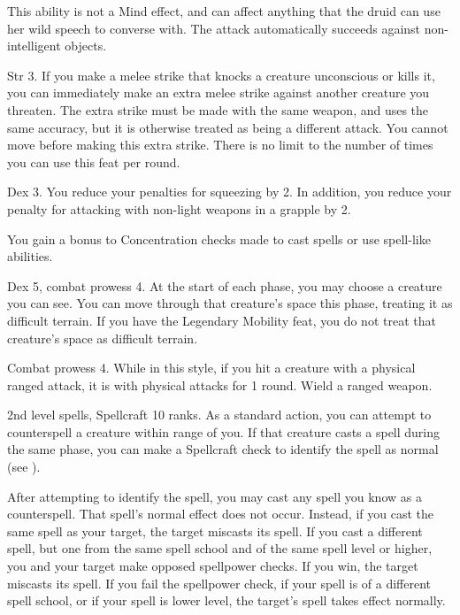 This ability is not a Mind effect, and can affect anything that the druid can use her wild speech to converse with.
The attack automatically succeeds against non-intelligent objects.

\featpre Str 3.
\featben If you make a melee strike that knocks a creature unconscious or kills it, you can immediately make an extra melee strike against another creature you threaten.
The extra strike must be made with the same weapon, and uses the same accuracy, but it is otherwise treated as being a different attack.
You cannot move before making this extra strike.
There is no limit to the number of times you can use this feat per round.

\featpre Dex 3.
\featben You reduce your penalties for squeezing by 2. In addition, you reduce your penalty for attacking with non-light weapons in a grapple by 2.

\featben You gain a  bonus to Concentration checks made to cast spells or use spell-like abilities.

\featpre Dex 5, combat prowess 4.
\featben At the start of each phase, you may choose a creature you can see.
You can move through that creature's space this phase, treating it as difficult terrain.
 If you have the Legendary Mobility feat, you do not treat that creature's space as difficult terrain.

\featpres Combat prowess 4.
\featben While in this style, if you hit a creature with a physical ranged attack, it is \impaired with physical attacks for 1 round.
\stylereq Wield a ranged weapon.

\featpres 2nd level spells, Spellcraft 10 ranks.
\featben As a standard action, you can attempt to counterspell a creature within \rngmed range of you.
If that creature casts a spell during the same phase, you can make a Spellcraft check to identify the spell as normal (see ).

After attempting to identify the spell, you may cast any spell you know as a counterspell.
That spell's normal effect does not occur.
Instead, if you cast the same spell as your target, the target miscasts its spell.
If you cast a different spell, but one from the same spell school and of the same spell level or higher, you and your target make opposed spellpower checks.
If you win, the target miscasts its spell.
If you fail the spellpower check, if your spell is of a different spell school, or if your spell is lower level, the target's spell takes effect normally.

